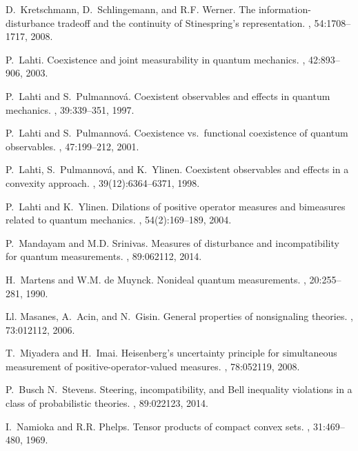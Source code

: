 \documentclass[12pt]{article}
\theoremstyle{definition}
\begin{document}
{\begin{thebibliography}{10}
D.~Kretschmann, D.~Schlingemann, and R.F. Werner.
\newblock The information-disturbance tradeoff and the continuity of
  {S}tinespring's representation.
, 54:1708--1717, 2008.

P.~Lahti.
\newblock Coexistence and joint measurability in quantum mechanics.
, 42:893--906, 2003.

P.~Lahti and S.~Pulmannov{\'a}.
\newblock Coexistent observables and effects in quantum mechanics.
, 39:339--351, 1997.

P.~Lahti and S.~Pulmannov{\'a}.
\newblock Coexistence vs.\ functional coexistence of quantum observables.
, 47:199--212, 2001.

P.~Lahti, S.~Pulmannov{\'a}, and K.~Ylinen.
\newblock Coexistent observables and effects in a convexity approach.
, 39(12):6364--6371, 1998.

P.~Lahti and K.~Ylinen.
\newblock Dilations of positive operator measures and bimeasures related to
  quantum mechanics.
, 54(2):169--189, 2004.

P.~Mandayam and M.D. Srinivas.
\newblock Measures of disturbance and incompatibility for quantum measurements.
, 89:062112, 2014.

H.~Martens and W.M. {de Muynck}.
\newblock Nonideal quantum measurements.
, 20:255--281, 1990.

Ll. Masanes, A.~Acin, and N.~Gisin.
\newblock General properties of nonsignaling theories.
, 73:012112, 2006.

T.~Miyadera and H.~Imai.
\newblock Heisenberg's uncertainty principle for simultaneous measurement of
  positive-operator-valued measures.
, 78:052119, 2008.

P.~Busch N.~Stevens.
\newblock Steering, incompatibility, and {B}ell inequality violations in a
  class of probabilistic theories.
, 89:022123, 2014.

I.~Namioka and R.R. Phelps.
\newblock Tensor products of compact convex sets.
, 31:469--480, 1969.


\end{thebibliography}}
\end{document}
